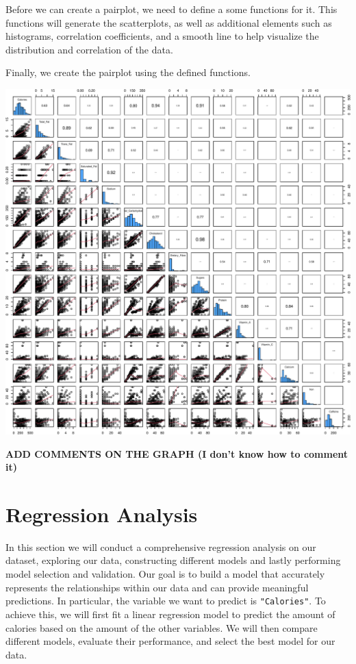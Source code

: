 \documentclass[
]{article}
\begin{document}
Before we can create a pairplot, we need to define a some functions for
it. This functions will generate the scatterplots, as well as additional
elements such as histograms, correlation coefficients, and a smooth line
to help visualize the distribution and correlation of the data.

Finally, we create the pairplot using the defined functions.

\begin{center}\includegraphics{Statistical_Learning_Final_Report_files/figure-latex/pairplot-1} \end{center}

\textbf{ADD COMMENTS ON THE GRAPH (I don't know how to comment it)}

\section{Regression Analysis}\label{regression-analysis}

In this section we will conduct a comprehensive regression analysis on
our dataset, exploring our data, constructing different models and
lastly performing model selection and validation. Our goal is to build a
model that accurately represents the relationships within our data and
can provide meaningful predictions. In particular, the variable we want
to predict is \texttt{"Calories"}. To achieve this, we will first fit a
linear regression model to predict the amount of calories based on the
amount of the other variables. We will then compare different models,
evaluate their performance, and select the best model for our data.
\end{document}
